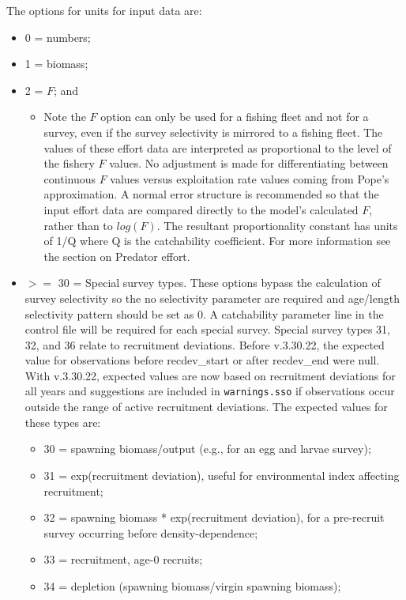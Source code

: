 \hypertarget{IndexUnits}{}
The options for units for input data are:	
	\begin{itemize}
		\item 0  = numbers;
		\item 1  = biomass; 
		\item 2  = $F$; and
		\begin{itemize}
			\item Note the $F$ option can only be used for a fishing fleet and not for a survey, even if the survey selectivity is mirrored to a fishing fleet. The values of these effort data are interpreted as proportional to the level of the fishery $F$ values. No adjustment is made for differentiating between continuous $F$ values versus exploitation rate values coming from Pope's approximation. A normal error structure is recommended so that the input effort data are compared directly to the model's calculated $F$, rather than to $log(F)$. The resultant proportionality constant has units of 1/Q where Q is the catchability coefficient. For more information see the section on \hypertarget{PredEffort}{Predator effort}.	
		\end{itemize}
		\item \hypertarget{SpecialSurvey}{} $>=$ 30 = Special survey types. These options bypass the calculation of survey selectivity so the no selectivity parameter are required and age/length selectivity pattern should be set as 0. A catchability parameter line in the control file will be required for each special survey. Special survey types 31, 32, and 36 relate to recruitment deviations. Before v.3.30.22, the expected value for observations before recdev\_start or after recdev\_end were null. With v.3.30.22, expected values are now based on recruitment deviations for all years and suggestions are included in \texttt{warnings.sso} if observations occur outside the range of active recruitment deviations. The expected values for these types are:
		\begin{itemize}
			\item 30 = spawning biomass/output (e.g., for an egg and larvae survey);
			\item 31 = exp(recruitment deviation), useful for environmental index affecting recruitment;
			\item 32 = spawning biomass * exp(recruitment deviation), for a pre-recruit survey occurring before density-dependence;
			\item 33 = recruitment, age-0 recruits;
			\item 34 = depletion (spawning biomass/virgin spawning biomass);

\end{itemize}
\end{itemize}

